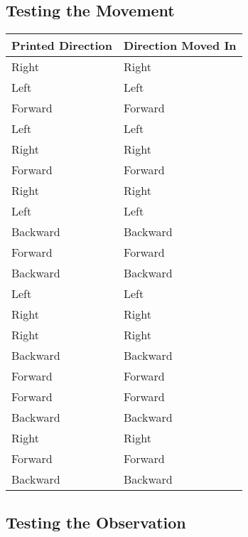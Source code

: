 			\subsection{Testing the Movement}
			\begin{table}[h!]
				\centering
				\begin{tabular}{|| l | l ||} 
					\hline
					Printed Direction & Direction Moved In &  \\ [0.5ex] 
					\hline
					Right & Right &  \\
					Left & Left &  \\ 
					Forward & Forward &  \\ 
					Left & Left &  \\ 
					Right & Right &  \\ 
					Forward & Forward &  \\ 
					Right & Right &  \\ 
					Left & Left &  \\ 
					Backward & Backward &  \\ 
					Forward & Forward &  \\ 
					Backward & Backward &  \\ 
					Left & Left &  \\ 
					Right & Right &  \\ 
					Right & Right &  \\ 
					Backward & Backward &  \\ 
					Forward & Forward &  \\ 
					Forward & Forward &  \\ 
					Backward & Backward &  \\ 
					Right & Right &  \\ 
					Forward & Forward &  \\ 
					Backward & Backward &  \\ [1ex] 
					\hline
				\end{tabular}
				\label{table:movementtests}		
			\end{table}
		
		\subsection{Testing the Observation}
		